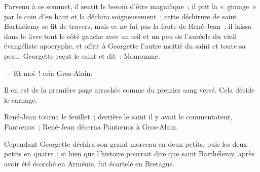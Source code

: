 \documentclass[french,twoside]{book} %
\begin{document}
 Parvenu à ce sommet, il sentit le besoin d’être magnifique ; il prit la « gimage » par le coin d’en haut et la déchira soigneusement ; cette déchirure de saint Barthélemy se fit de travers, mais ce ne fut pas la faute de René-Jean ; il laissa dans le livre tout le côté gauche avec un œil et un peu de l’auréole du vieil évangéliste apocryphe, et offrit à Georgette l’autre moitié du saint et toute sa peau. Georgette reçut le saint et dit : Momomme.\par
— Et moi ! cria Gros-Alain.\par
Il en est de la première page arrachée comme du premier sang versé. Cela décide le carnage.\par
René-Jean tourna le feuillet ; derrière le saint il y avait le commentateur, Pantœnus ; René-Jean décerna Pantœnus à Gros-Alain.\par
Cependant Georgette déchira son grand morceau en deux petits, puis les deux petits en quatre ; si bien que l’histoire pourrait dire que saint Barthélemy, après avoir été écorché en Arménie, fut écartelé en Bretagne.
\end{document}
